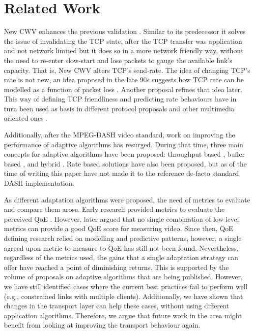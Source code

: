 \documentclass[10pt,sigconf,anonymous]{acmart}
\begin{document}
\section{Related Work}
\label{sec:related}

New CWV enhances the previous validation \cite{rfc2861-2000-padhye-congestion-window-validation}. Similar to its predecessor it solves the issue of invalidating the TCP state, after the TCP transfer was application and not network limited but it does so in a more network friendly way, without the need to re-enter slow-start and lose packets to gauge the available link's capacity. That is, New CWV alters TCP's send-rate. The idea of changing TCP's rate is not new, an idea proposed in the late 90s suggests how TCP rate can be modelled as a function of packet loss \cite{Mathis-1997-the-macroscopic-behavior-tcp}. Another proposal \cite{Padhye-1998-modelling-tcp-throughput} refines that idea later. This way of defining TCP friendliness and predicting rate behaviours have in turn been used as basis in different protocol proposals \cite{rfc-5348-tfrc,Rossi-2010-ledbat,Arun-2018-copa} and other multimedia oriented ones \cite{Carlucci-2016-Analysis-WebRTC,Choi-2007-fairer-tfrc}.


Additionally, after the MPEG-DASH video standard, work on improving the performance of adaptive algorithms has resurged. During that time, three main concepts for adaptive algorithms have been proposed: throughput based \cite{Sun-2016-cs2p, Jiang-2012-improving-fairness-http-video-festive}, buffer based \cite{Spiteri-2016-BOLA,Huang-2015-A-buffer-based-approach-to-rate-adaptation-bba}, and hybrid \cite{Spiteri-2019-from-theory-to-practice-sabre,Wang-2016-squad}. Rate based solutions \cite{Li-2014-probe-and-adapt-panda,Liu-2011-rate-adaptation} have also been proposed, but as of the time of writing this paper have not made it to the reference de-facto standard DASH implementation.


As different adaptation algorithms were proposed, the need of metrics to evaluate and compare them arose. Early research provided metrics to evaluate the perceived QoE \cite{Cranley-2006-user-perception-adapting-video}. However, later \cite{Balachandran-2012-quest-for-internet-video-qoe} argued that no single combination of low-level metrics can provide a good QoE score for measuring video. Since then, QoE defining research relied on modelling and predictive patterns, however, a single agreed upon metric to measure to QoE has still not been found. Nevertheless, regardless of the metrics used, the gains that a single adaptation strategy can offer have reached a point of diminishing returns. This is supported by the volume of proposals on adaptive algorithms that are being published. However, we have still identified cases where the current best practices fail to perform well (e.g., constrained links with multiple clients). Additionally, we have shown that changes in the transport layer can help these cases, without using different application algorithms. Therefore, we argue that future work in the area might benefit from looking at improving the transport behaviour again. 
\end{document}
